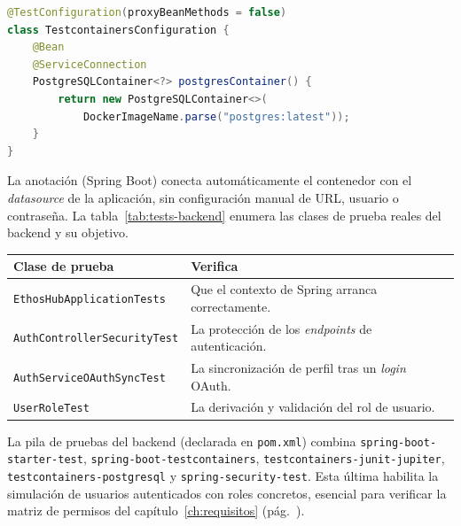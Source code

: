 \clearpage
\begin{lstlisting}[language=Java, caption={Configuración de Testcontainers con \texttt{@ServiceConnection} (\texttt{TestcontainersConfiguration.java}).}, label={lst:testcontainers}]
@TestConfiguration(proxyBeanMethods = false)
class TestcontainersConfiguration {
    @Bean
    @ServiceConnection
    PostgreSQLContainer<?> postgresContainer() {
        return new PostgreSQLContainer<>(
            DockerImageName.parse("postgres:latest"));
    }
}
\end{lstlisting}

La anotación  (Spring Boot) conecta automáticamente el
contenedor con el \textit{datasource} de la aplicación, sin configuración manual de URL,
usuario o contraseña. La tabla~\ref{tab:tests-backend} enumera las clases de prueba reales
del backend y su objetivo.

\vspace{0.2cm}
\noindent
\renewcommand{\arraystretch}{1.3}
\fontsize{8.5}{10.2}\selectfont\sffamily
\begin{tabularx}{\textwidth}{|L{5.0cm}|Y|}
\hline
{}
\sffamily\textbf{Clase de prueba} & \sffamily\textbf{Verifica} \\
\hline
\texttt{EthosHubApplicationTests} & Que el contexto de Spring arranca correctamente. \\ \hline
{}
\texttt{AuthControllerSecurityTest} & La protección de los \textit{endpoints} de autenticación. \\ \hline
\texttt{AuthServiceOAuthSyncTest} & La sincronización de perfil tras un \textit{login} OAuth. \\ \hline
{}
\texttt{UserRoleTest} & La derivación y validación del rol de usuario. \\ \hline
\end{tabularx}
\label{tab:tests-backend}

\begin{NotaTecnica}
La pila de pruebas del backend (declarada en \texttt{pom.xml}) combina
\texttt{spring-boot-starter-test}, \texttt{spring-boot-testcontainers},
\texttt{testcontainers-junit-jupiter}, \texttt{testcontainers-postgresql} y
\texttt{spring-security-test}. Esta última habilita la simulación de usuarios autenticados
con roles concretos, esencial para verificar la matriz de permisos del
capítulo~\ref{ch:requisitos} (pág.~\pageref{ch:requisitos}).
\end{NotaTecnica}

